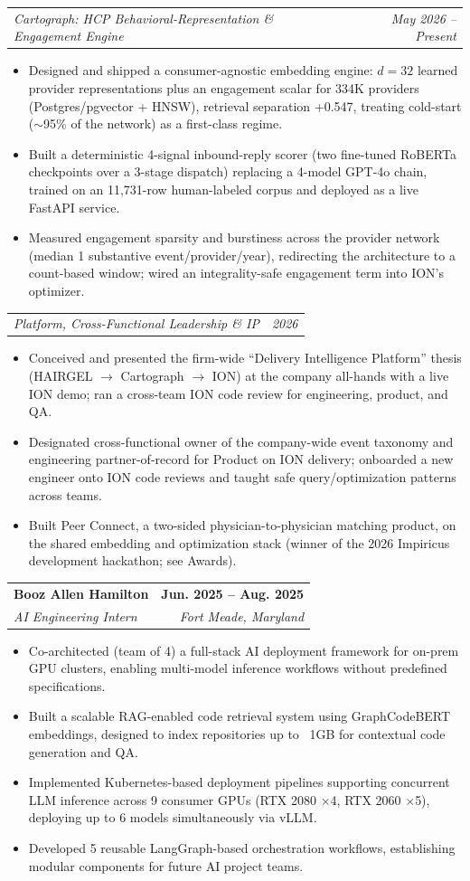 \documentclass[letterpaper,11pt]{article}
\makeatletter
\newcommand{\resumeItem}[1]{
  \item\small{
    {#1 \vspace{-2pt}}
  }
}
\newcommand{\resumeSubheading}[4]{
  \vspace{-2pt}\item
    \begin{tabular*}{1.0\textwidth}[t]{l@{\extracolsep{\fill}}r}
      \textbf{#1} & \textbf{\small #2} \\
      \textit{\small#3} & \textit{\small #4} \\
    \end{tabular*}\vspace{-7pt}
}
\newcommand{\resumeSubSubheading}[2]{
    \item
    \begin{tabular*}{0.97\textwidth}{l@{\extracolsep{\fill}}r}
      \textit{\small#1} & \textit{\small #2} \\
    \end{tabular*}\vspace{-7pt}
}
\newcommand{\resumeItemListStart}{\begin{itemize}}
\newcommand{\resumeItemListEnd}{\end{itemize}\vspace{-5pt}}
\makeatother
\begin{document}
          \resumeSubSubheading{Cartograph: HCP Behavioral-Representation \& Engagement Engine}{May 2026 -- Present}
          \resumeItemListStart
            \resumeItem{Designed and shipped a consumer-agnostic embedding engine: $d=32$ learned provider representations plus an engagement scalar for 334K providers (Postgres/pgvector + HNSW), retrieval separation +0.547, treating cold-start ($\sim$95\% of the network) as a first-class regime.}
            \resumeItem{Built a deterministic 4-signal inbound-reply scorer (two fine-tuned RoBERTa checkpoints over a 3-stage dispatch) replacing a 4-model GPT-4o chain, trained on an 11,731-row human-labeled corpus and deployed as a live FastAPI service.}
            \resumeItem{Measured engagement sparsity and burstiness across the provider network (median 1 substantive event/provider/year), redirecting the architecture to a count-based window; wired an integrality-safe engagement term into ION's optimizer.}
          \resumeItemListEnd

          \resumeSubSubheading{Platform, Cross-Functional Leadership \& IP}{2026}
          \resumeItemListStart
            \resumeItem{Conceived and presented the firm-wide ``Delivery Intelligence Platform'' thesis (HAIRGEL $\rightarrow$ Cartograph $\rightarrow$ ION) at the company all-hands with a live ION demo; ran a cross-team ION code review for engineering, product, and QA.}
            \resumeItem{Designated cross-functional owner of the company-wide event taxonomy and engineering partner-of-record for Product on ION delivery; onboarded a new engineer onto ION code reviews and taught safe query/optimization patterns across teams.}
            \resumeItem{Built Peer Connect, a two-sided physician-to-physician matching product, on the shared embedding and optimization stack (winner of the 2026 Impiricus development hackathon; see Awards).}
          \resumeItemListEnd

        \resumeSubheading
          {Booz Allen Hamilton}{Jun. 2025 -- Aug. 2025}
          {AI Engineering Intern}{Fort Meade, Maryland}
          \resumeItemListStart
            \resumeItem{Co-architected (team of 4) a full-stack AI deployment framework for on-prem GPU clusters, enabling multi-model inference workflows without predefined specifications.}
            \resumeItem{Built a scalable RAG-enabled code retrieval system using GraphCodeBERT embeddings, designed to index repositories up to ~1GB for contextual code generation and QA.}
            \resumeItem{Implemented Kubernetes-based deployment pipelines supporting concurrent LLM inference across 9 consumer GPUs (RTX 2080 $\times$4, RTX 2060 $\times$5), deploying up to 6 models simultaneously via vLLM.}
            \resumeItem{Developed 5 reusable LangGraph-based orchestration workflows, establishing modular components for future AI project teams.}
          \resumeItemListEnd
\end{document}
